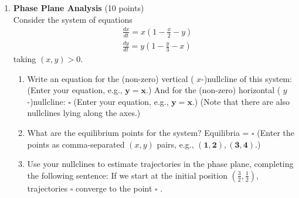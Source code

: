 \begin{enumerate}
  \item \textbf{Phase Plane Analysis} (10 points)\\
  Consider the system of equations
  $$
  \begin{aligned}
  & \frac{d x}{d t}=x\left(1-\frac{x}{2}-y\right) \\
  & \frac{d y}{d t}=y\left(1-\frac{y}{3}-x\right)
  \end{aligned}
  $$
  taking $(x, y)>0$.
  \begin{enumerate}[label=\alph*]
    \item Write an equation for the (non-zero) vertical ( $x$-)nullcline of this system:
    (Enter your equation, e.g., $\boldsymbol{y}=\boldsymbol{x}$.)
    And for the (non-zero) horizontal ( $y$-)nullcline:
    $\square$
    (Enter your equation, e.g., $\boldsymbol{y}=\boldsymbol{x}$.)
    (Note that there are also nullclines lying along the axes.)
    \begin{subanswer}
    \end{subanswer}
    \item What are the equilibrium points for the system?
    Equilibria = $\square$
    (Enter the points as comma-separated $(x, y)$ pairs, e.g., $(\mathbf{1 , 2}),(\mathbf{3 , 4})$.)
    \begin{subanswer}
    \end{subanswer}
    \item Use your nullclines to estimate trajectories in the phase plane, completing the following sentence:
    If we start at the initial position $\left(\frac{3}{2}, \frac{1}{2}\right)$, trajectories $\square$ converge to the point $\square$ .
    \begin{subanswer}
    \end{subanswer}
  \end{enumerate}


\end{enumerate}
